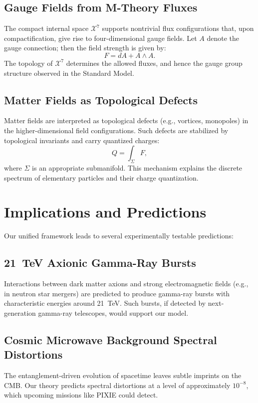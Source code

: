 \documentclass[12pt, a4paper]{article}
\begin{document}
\subsection{Gauge Fields from M-Theory Fluxes}
The compact internal space \(\mathcal{X}^7\) supports nontrivial flux configurations that, upon compactification, give rise to four-dimensional gauge fields. Let \(A\) denote the gauge connection; then the field strength is given by:
\begin{equation}
    F = dA + A \wedge A.
\end{equation}
The topology of \(\mathcal{X}^7\) determines the allowed fluxes, and hence the gauge group structure observed in the Standard Model.

\subsection{Matter Fields as Topological Defects}
Matter fields are interpreted as topological defects (e.g., vortices, monopoles) in the higher-dimensional field configurations. Such defects are stabilized by topological invariants and carry quantized charges:
\begin{equation}
    Q = \int_{\Sigma} F,
\end{equation}
where \(\Sigma\) is an appropriate submanifold. This mechanism explains the discrete spectrum of elementary particles and their charge quantization.

\section{Implications and Predictions}
Our unified framework leads to several experimentally testable predictions:

\subsection{21~TeV Axionic Gamma-Ray Bursts}
Interactions between dark matter axions and strong electromagnetic fields (e.g., in neutron star mergers) are predicted to produce gamma-ray bursts with characteristic energies around 21~TeV. Such bursts, if detected by next-generation gamma-ray telescopes, would support our model.

\subsection{Cosmic Microwave Background Spectral Distortions}
The entanglement-driven evolution of spacetime leaves subtle imprints on the CMB. Our theory predicts spectral distortions at a level of approximately $10^{-8}$, which upcoming missions like PIXIE could detect.
\end{document}
